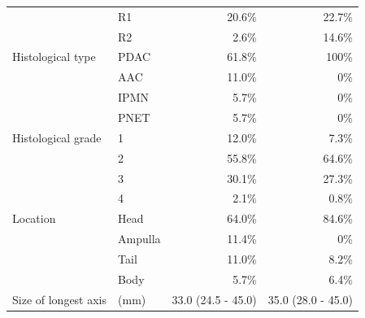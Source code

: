 \documentclass[dissertation.tex]{subfiles}
\begin{document}
\begin{table}[!htbp]
{\begin{tabular}{@{}llrr@{}}
                           & R1                       & 20.6\%                   & 22.7\%                                                 \\
                           & R2                       & 2.6\%                    & 14.6\%                                                 \\
Histological type          & \gls{PDAC}             & 61.8\%                   & 100\%                                                  \\
                           & AAC & 11.0\%                   & 0\%                                                    \\
                           & IPMN                     & 5.7\%                    & 0\%                                                    \\
                           & PNET                     & 5.7\%                    & 0\%                                                    \\
Histological grade         & 1                        & 12.0\%                   & 7.3\%                                                  \\
                           & 2                        & 55.8\%                   & 64.6\%                                                 \\
                           & 3                        & 30.1\%                   & 27.3\%                                                 \\
                           & 4                        & 2.1\%                    & 0.8\%                                                  \\
Location                   & Head                     & 64.0\%                   & 84.6\%                                                 \\
                           & Ampulla                  & 11.4\%                   & 0\%                                                    \\
                           & Tail                     & 11.0\%                   & 8.2\%                                                  \\
                           & Body                     & 5.7\%                    & 6.4\%                                                  \\
Size of longest axis                & (mm)                     & 33.0 (24.5 - 45.0)       & 35.0 (28.0 - 45.0)                                     \\

\end{tabular}}
\end{table}
\end{document}
